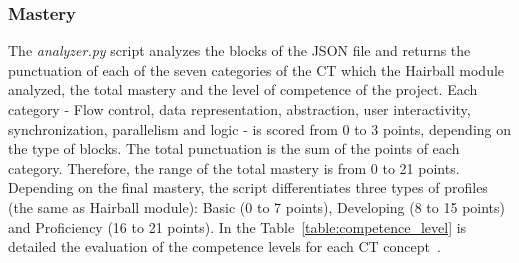 \subsubsection{Mastery}
\label{subsubsec:mastery}

The \textit{analyzer.py} script analyzes the blocks of the JSON file and returns the punctuation of each of the seven categories of the CT which the Hairball module analyzed, the total mastery and the level of competence of the project. Each category - Flow control, data representation, abstraction, user interactivity, synchronization, parallelism and logic - is scored from 0 to 3 points, depending on the type of blocks. The total punctuation is the sum of the points of each category. Therefore, the range of the total mastery is from 0 to 21 points. Depending on the final mastery, the script differentiates three types of profiles (the same as Hairball module): Basic (0 to 7 points), Developing (8 to 15 points) and Proficiency (16 to 21 points). In the Table~\ref{table:competence_level} is detailed the evaluation of the competence levels for each CT concept~\cite{moreno2015dr}.

